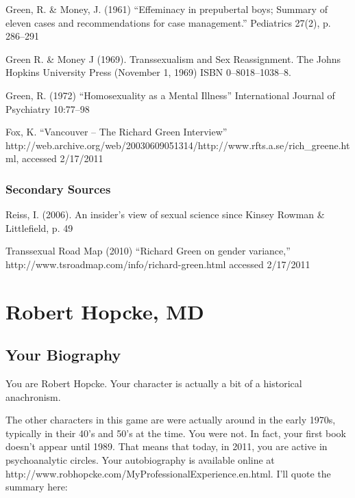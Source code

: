 \begin{refsection}
Green, R. \& Money, J. (1961) “Effeminacy in prepubertal boys; Summary of eleven cases and recommendations for case management.” Pediatrics 27(2), p. 286--291

Green R. \& Money J (1969). Transsexualism and Sex Reassignment. The Johns Hopkins University Press (November 1, 1969) ISBN 0--8018--1038--8.

Green, R. (1972) “Homosexuality as a Mental Illness” International Journal of Psychiatry 10:77--98

Fox, K. “Vancouver – The Richard Green Interview” http:\slash \slash web.archive.org\slash web\slash 20030609051314\slash http:\slash \slash www.rfts.a.se\slash rich\_greene.html, accessed 2\slash 17\slash 2011

\subsection{Secondary Sources}
\label{secondarysources}

Reiss, I. (2006). An insider's view of sexual science since Kinsey Rowman \& Littlefield, p. 49

Transsexual Road Map (2010) “Richard Green on gender variance,” http:\slash \slash www.tsroadmap.com\slash info\slash richard-green.html accessed 2\slash 17\slash 2011

\chapter{Robert Hopcke, MD}
\label{roberthopckemd}

\section{Your Biography}
\label{yourbiography}

You are Robert Hopcke. Your character is actually a bit of a historical anachronism. 

The other characters in this game are were actually around in the early 1970s, typically in their 40's and 50's at the time. You were not. In fact, your first book doesn't appear until 1989. That means that today, in 2011, you are active in psychoanalytic circles. Your autobiography is available online at http:\slash \slash www.robhopcke.com\slash MyProfessionalExperience.en.html. I'll quote the summary here:

\begin{quote}


\end{quote}
\end{refsection}

